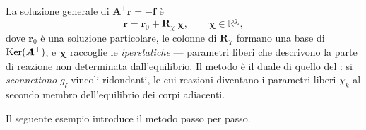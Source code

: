 La soluzione generale di $\bm{A}^{\top}\bm{r} = -\bm{f}$ è
\begin{equation}\label{eq:sol_iper_stat}
	\bm{r} = \bm{r}_0 + \bm{R}_\chi\,\bm{\chi},
	\qquad \bm{\chi} \in \mathbb{R}^{g_{\mathscr{i}}},
\end{equation}
dove $\bm{r}_0$ è una soluzione particolare, le colonne di $\bm{R}_\chi$
formano una base di $\operatorname{Ker}(\bm{A}^{\top})$, e $\bm{\chi}$ raccoglie
le \emph{iperstatiche} --- parametri liberi che descrivono la parte
di reazione non determinata dall'equilibrio.
Il metodo è il duale di quello del :
si \emph{sconnettono} $g_{\mathscr{i}}$ vincoli ridondanti, le cui
reazioni diventano i parametri liberi $\chi_k$ al secondo membro
dell'equilibrio dei corpi adiacenti.

Il seguente esempio introduce il metodo passo per passo.

